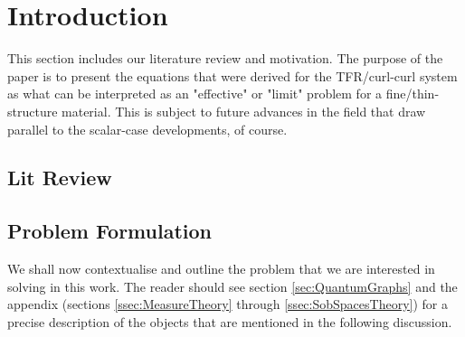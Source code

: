 \section{Introduction} \label{sec:Intro}

This section includes our literature review and motivation.
The purpose of the paper is to present the equations that were derived for the TFR/curl-curl system as what can be interpreted as an "effective" or "limit" problem for a fine/thin-structure material.
This is subject to future advances in the field that draw parallel to the scalar-case developments, of course.

\subsection{Lit Review} \label{ssec:LitReview}

\subsection{Problem Formulation} \label{ssec:OurSystem}
We shall now contextualise and outline the problem that we are interested in solving in this work.
The reader should see section \ref{sec:QuantumGraphs} and the appendix (sections \ref{ssec:MeasureTheory} through \ref{ssec:SobSpacesTheory}) for a precise description of the objects that are mentioned in the following discussion. \newline

